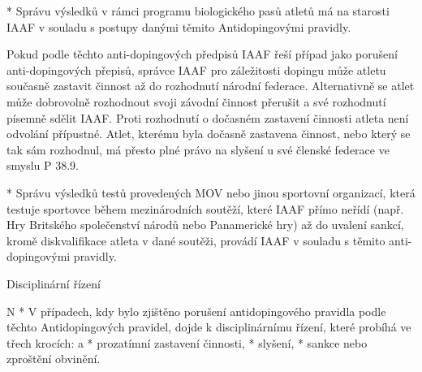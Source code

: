* Správu výsledků v rámci programu biologického pasů atletů má na starosti IAAF v souladu s postupy danými těmito Antidopingovými pravidly.

Pokud podle těchto anti-dopingových předpisů IAAF řeší případ jako porušení anti-dopingových přepisů, správce IAAF pro záležitosti dopingu může atletu současně zastavit činnost až do rozhodnutí národní federace. Alternativně se atlet může dobrovolně rozhodnout svoji závodní činnost přerušit a své rozhodnutí písemně sdělit IAAF. Proti rozhodnutí o dočasném zastavení činnosti atleta není odvolání přípustné. Atlet, kterému byla dočasně zastavena činnost, nebo který se tak sám rozhodnul, má přesto plné právo na slyšení u své členské federace ve smyslu P 38.9.

* Správu výsledků testů provedených MOV nebo jinou sportovní organizací, která testuje sportovce během mezinárodních soutěží, které IAAF přímo neřídí (např. Hry Britského společenství národů nebo Panamerické hry) až do uvalení sankcí, kromě diskvalifikace atleta v dané soutěži, provádí IAAF v souladu s těmito anti-dopingovými pravidly.
\enditems

\secc Disciplinární řízení

\begitems \style N
* V případech, kdy bylo zjištěno porušení antidopingového pravidla podle těchto Antidopingových pravidel, dojde k disciplinárnímu řízení, které probíhá ve třech krocích:
  \begitems \style a
  * prozatímní zastavení činnosti,
  * slyšení,
  * sankce nebo zproštění obvinění.
  \enditems

